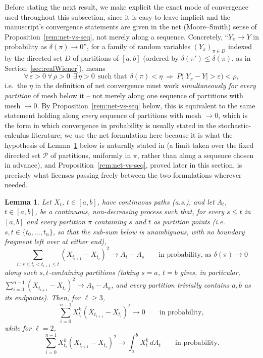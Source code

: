 \documentclass[11pt,fleqn]{article}
\newcommand{\eps}{\varepsilon}
\theoremstyle{plain}
\newtheorem{lemma}[thm]{Lemma}
\theoremstyle{remark}
\begin{document}
Before stating the next result, we make explicit the exact mode of
convergence used throughout this subsection, since it is easy to leave
implicit and the manuscript's convergence statements are given in the
net (Moore--Smith) sense of Proposition~\ref{rem:net-vs-seq}, not merely
along a sequence. Concretely, ``$Y_\pi\to Y$ in probability as
$\delta(\pi)\to0$'', for a family of random variables $(Y_\pi)_{\pi\in
D}$ indexed by the directed set $D$ of partitions of $[a,b]$ (ordered
by $\delta(\pi')\le\delta(\pi)$, as in Section~\ref{sec:realWiener}),
means
\[
\forall\,\eps>0\ \forall\,\rho>0\ \ \exists\,\eta>0\ \ \text{such that}\ \
\delta(\pi)<\eta\ \Longrightarrow\ P\big(|Y_\pi-Y|>\eps\big)<\rho,
\]
i.e.\ the $\eta$ in the definition of net convergence must work
\emph{simultaneously for every partition} of mesh below it -- not merely
along one sequence of partitions with mesh $\to0$. By
Proposition~\ref{rem:net-vs-seq} below, this is equivalent to the same
statement holding along \emph{every} sequence of partitions with mesh
$\to0$, which is the form in which convergence in probability is usually
stated in the stochastic-calculus literature; we use the net formulation
here because it is what the hypothesis of Lemma~\ref{lem:l2} below is
naturally stated in (a limit taken over the fixed directed set
$\mathcal P$ of partitions, uniformly in $\pi$, rather than along a
sequence chosen in advance), and Proposition~\ref{rem:net-vs-seq},
proved later in this section, is precisely what licenses passing freely
between the two formulations wherever needed.

\begin{lemma}\label{lem:l2}
Let $X_t$, $t\in[a,b]$, have continuous paths (a.s.), and let $A_t$,
$t\in[a,b]$, be a continuous, non-decreasing process such that, for
every $s\le t$ in $[a,b]$ and every partition $\pi$ \emph{containing}
$s$ and $t$ as partition points (i.e.\ $s,t\in\{t_0,\ldots,t_n\}$, so
that the sub-sum below is unambiguous, with no boundary fragment left
over at either end),
\[
\sum_{i\,:\,s\le t_i<t_{i+1}\le t}(X_{t_{i+1}}-X_{t_i})^2
\longrightarrow A_t-A_s\qquad\text{in probability, as }\delta(\pi)\to0
\]
along such $s,t$-containing partitions (taking $s=a$, $t=b$ gives, in
particular, $\sum_{i=0}^{n-1}(X_{t_{i+1}}-X_{t_i})^2\to A_b-A_a$, and
every partition trivially contains $a,b$ as its endpoints). Then, for
$\ell\ge3$,
\[
\sum_{i=0}^{n-1}X_{t_i}^k(X_{t_{i+1}}-X_{t_i})^\ell\longrightarrow0
\qquad\text{in probability},
\]
while for $\ell=2$,
\[
\sum_{i=0}^{n-1}X_{t_i}^k(X_{t_{i+1}}-X_{t_i})^2\longrightarrow\int_a^bX_t^k\,dA_t
\qquad\text{in probability}.
\]
\end{lemma}
\end{document}
